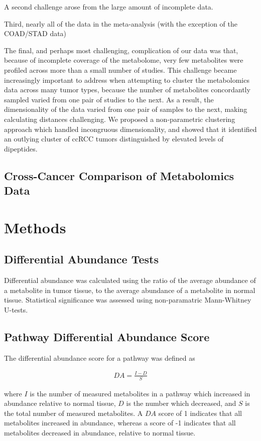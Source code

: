 \documentclass[10pt]{article}
\begin{document}
A second challenge arose from the large amount of incomplete data. 

Third, nearly all of the data in the meta-analysis (with the exception of the COAD/STAD data) 

The final, and perhaps most challenging, complication of our data was that, because of incomplete coverage of the metabolome, very few metabolites were profiled across more than a small number of studies. This challenge became increasingly important to address when attempting to cluster the metabolomics data across many tumor types, because the number of metabolites concordantly sampled varied from one pair of studies to the next. As a result, the dimensionality of the data varied from one pair of samples to the next, making calculating distances challenging. We proposed a non-parametric clustering approach which handled incongruous dimensionality, and showed that it identified an outlying cluster of ccRCC tumors distinguished by elevated levels of dipeptides.


\subsection{Cross-Cancer Comparison of Metabolomics Data}


\section{Methods}

\subsection{Differential Abundance Tests}
Differential abundance was calculated using the ratio of the average abundance of a metabolite in tumor tissue, to the average abundance of a metabolite in normal tissue. Statistical significance was assessed using non-paramatric Mann-Whitney U-tests.

\subsection{Pathway Differential Abundance Score}
The differential abundance score for a pathway was defined as

\begin{align*}
DA = \frac{I - D}{S}
\end{align*}

\noindent where $I$ is the number of measured metabolites in a pathway which increased in abundance relative to normal tissue, $D$ is the number which decreased, and $S$ is the total number of measured metabolites. A $DA$ score of 1 indicates that all metabolites increased in abundance, whereas a score of -1 indicates that all metabolites decreased in abundance, relative to normal tissue.
\end{document}

